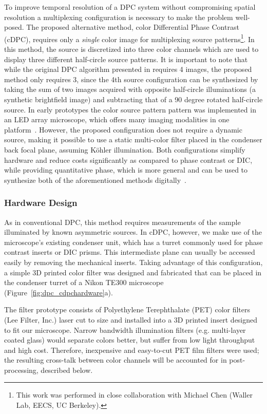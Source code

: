 To improve temporal resolution of a DPC system without compromising spatial resolution a multiplexing configuration is necessary to make the problem well-posed. The proposed alternative method, color Differential Phase Contrast (cDPC), requires only a \emph{single} color image for multiplexing source patterns\footnote{This work was performed in close collaboration with Michael Chen (Waller Lab, EECS, UC Berkeley).}. In this method, the source is discretized into three color channels which are used to display three different half-circle source patterns. It is important to note that while the original DPC algorithm presented in \cite{tian2015quantitative} requires 4 images, the proposed method only requires 3, since the 4th source configuration can be synthesized by taking the sum of two images acquired with opposite half-circle illuminations (a synthetic brightfield image) and subtracting that of a 90 degree rotated half-circle source. In early prototypes the color source pattern pattern was implemented in an LED array microscope, which offers many imaging modalities in one platform~\cite{Tian14,zijiMulti,tian2015quantitative,Ma:15,phillips2015multi, Zheng2011, Zheng2013}. However, the proposed configuration does not require a dynamic source, making it possible to use a static multi-color filter placed in the condenser back focal plane, assuming K\"{o}hler illumination. Both configurations simplify hardware and reduce costs significantly as compared to phase contrast or DIC, while providing quantitative phase, which is more general and can be used to synthesize both of the aforementioned methods digitally~\cite{JMI:JMI1027}.

\subsubsection{Hardware Design}
As in conventional DPC, this method requires measurements of the sample illuminated by known asymmetric sources. In cDPC, however, we make use of the microscope's existing condenser unit, which has a turret commonly used for phase contrast inserts or DIC prisms. This intermediate plane can usually be accessed easily by removing the mechanical inserts. Taking advantage of this configuration, a simple 3D printed color filter was designed and fabricated that can be placed in the condenser turret of a Nikon TE300 microscope (Figure~\ref{fig:dpc_cdpchardware}a).

The filter prototype consists of Polyethylene Terephthalate (PET) color filters (Lee Filter, Inc.) laser cut to size and installed into a 3D printed insert designed to fit our microscope. Narrow bandwidth illumination filters (e.g. multi-layer coated glass) would separate colors better, but suffer from low light throughput and high cost. Therefore, inexpensive and easy-to-cut PET film filters were used; the resulting cross-talk between color channels will be accounted for in post-processing, described below.

